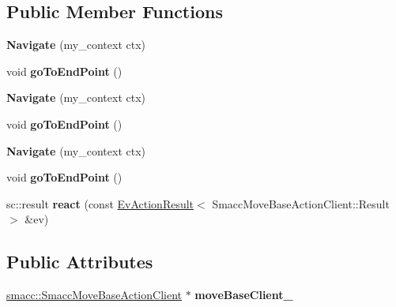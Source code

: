 \subsection*{Public Member Functions}
\begin{DoxyCompactItemize}
\item 
{\bfseries Navigate} (my\+\_\+context ctx)\hypertarget{structNavigate_a6be585a62dc40f453857b649017b4e82}{}\label{structNavigate_a6be585a62dc40f453857b649017b4e82}

\item 
void {\bfseries go\+To\+End\+Point} ()\hypertarget{structNavigate_a941523c9ba8391d3775d6b7f62fe1261}{}\label{structNavigate_a941523c9ba8391d3775d6b7f62fe1261}

\item 
{\bfseries Navigate} (my\+\_\+context ctx)\hypertarget{structNavigate_a6be585a62dc40f453857b649017b4e82}{}\label{structNavigate_a6be585a62dc40f453857b649017b4e82}

\item 
void {\bfseries go\+To\+End\+Point} ()\hypertarget{structNavigate_a941523c9ba8391d3775d6b7f62fe1261}{}\label{structNavigate_a941523c9ba8391d3775d6b7f62fe1261}

\item 
{\bfseries Navigate} (my\+\_\+context ctx)\hypertarget{structNavigate_a6be585a62dc40f453857b649017b4e82}{}\label{structNavigate_a6be585a62dc40f453857b649017b4e82}

\item 
void {\bfseries go\+To\+End\+Point} ()\hypertarget{structNavigate_a941523c9ba8391d3775d6b7f62fe1261}{}\label{structNavigate_a941523c9ba8391d3775d6b7f62fe1261}

\item 
sc\+::result {\bfseries react} (const \hyperlink{structsmacc_1_1EvActionResult}{Ev\+Action\+Result}$<$ Smacc\+Move\+Base\+Action\+Client\+::\+Result $>$ \&ev)\hypertarget{structNavigate_ac058d0da392b7c5e1873702820595ae4}{}\label{structNavigate_ac058d0da392b7c5e1873702820595ae4}

\end{DoxyCompactItemize}
\subsection*{Public Attributes}
\begin{DoxyCompactItemize}
\item 
\hyperlink{classsmacc_1_1SmaccMoveBaseActionClient}{smacc\+::\+Smacc\+Move\+Base\+Action\+Client} $\ast$ {\bfseries move\+Base\+Client\+\_\+}\hypertarget{structNavigate_a6ccf129ef69c3a8f664ecb8c367dae86}{}\label{structNavigate_a6ccf129ef69c3a8f664ecb8c367dae86}

\end{DoxyCompactItemize}
